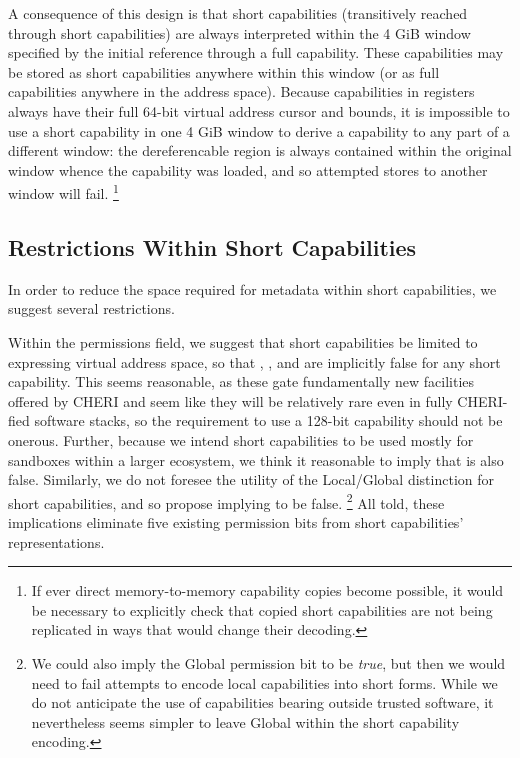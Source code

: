 A consequence of this design is that short capabilities (transitively
reached through short capabilities) are always interpreted within the 4 GiB
window specified by the initial reference through a full capability.  These
capabilities may be stored as short capabilities anywhere within this window
(or as full capabilities anywhere in the address space).  Because
capabilities in registers always have their full 64-bit virtual address
cursor and bounds, it is impossible to use a short capability in one 4 GiB
window to derive a capability to any part of a different window: the
dereferencable region is always contained within the original window whence
the capability was loaded, and so attempted stores to another window will
fail.%
%
\footnote{If ever direct memory-to-memory capability copies become possible,
it would be necessary to explicitly check that copied short capabilities are
not being replicated in ways that would change their decoding.}


\subsection{Restrictions Within Short Capabilities} %

In order to reduce the space required for metadata within short
capabilities, we suggest several restrictions.

Within the permissions field, we suggest that short capabilities be limited
to expressing virtual address space, so that \cappermSeal, \cappermUnseal,
and \cappermCid are implicitly false for any short capability.  This
seems reasonable, as these gate fundamentally new facilities offered by CHERI
and seem like they will be relatively rare even in fully CHERI-fied software
stacks, so the requirement to use a 128-bit capability should not be
onerous.
%
Further, because we intend short capabilities to be used mostly for
sandboxes within a larger ecosystem, we think it reasonable to imply that
\cappermASR is also false.
%
Similarly, we do not foresee the utility of the Local/Global distinction for
short capabilities, and so propose implying
\cappermSLC to be false.%
%
\footnote{We could also imply the Global permission bit to be \emph{true},
but then we would need to fail attempts to encode local capabilities into short
forms.  While we do not anticipate the use of capabilities bearing
\cappermSLC outside trusted
software, it nevertheless seems simpler to leave Global within the short
capability encoding.}
%
All told, these implications eliminate five existing permission bits from
short capabilities' representations.

